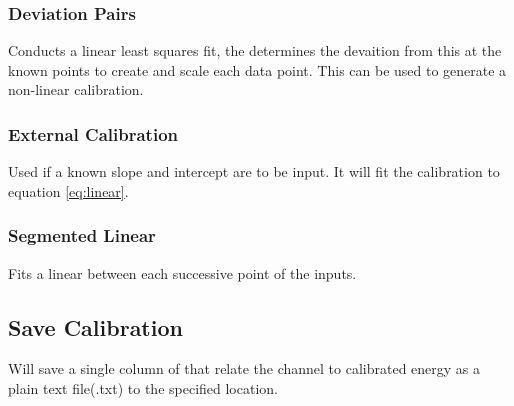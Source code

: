 				\subsubsection{Deviation Pairs}
				Conducts a linear least squares fit, the determines the devaition from this at the known points to create and scale each data point. This can be used to generate a non-linear calibration.
				\subsubsection{External Calibration}
				Used if a known slope and intercept are to be input. It will fit the calibration to equation \ref{eq:linear}.
				\subsubsection{Segmented Linear}
				Fits a linear between each successive point of the inputs.
	\subsection{Save Calibration}
	Will save a single column of that relate the channel to calibrated energy as a plain text file(.txt) to the specified location.